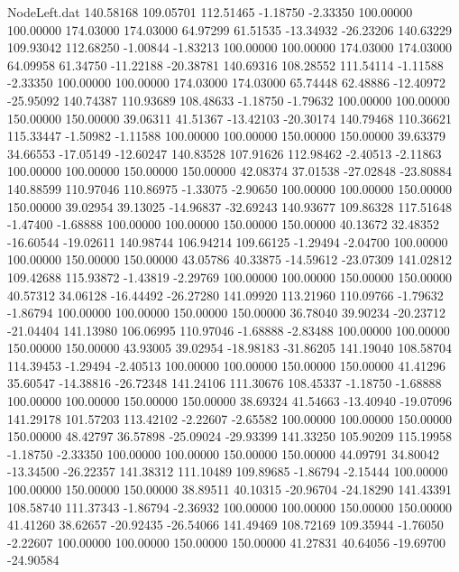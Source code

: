 \begin{filecontents}{NodeLeft.dat}
 140.58168  109.05701  112.51465    -1.18750   -2.33350  100.00000  100.00000  174.03000  174.03000   64.97299   61.51535  -13.34932  -26.23206
 140.63229  109.93042  112.68250    -1.00844   -1.83213  100.00000  100.00000  174.03000  174.03000   64.09958   61.34750  -11.22188  -20.38781
 140.69316  108.28552  111.54114    -1.11588   -2.33350  100.00000  100.00000  174.03000  174.03000   65.74448   62.48886  -12.40972  -25.95092
 140.74387  110.93689  108.48633    -1.18750   -1.79632  100.00000  100.00000  150.00000  150.00000   39.06311   41.51367  -13.42103  -20.30174
 140.79468  110.36621  115.33447    -1.50982   -1.11588  100.00000  100.00000  150.00000  150.00000   39.63379   34.66553  -17.05149  -12.60247
 140.83528  107.91626  112.98462    -2.40513   -2.11863  100.00000  100.00000  150.00000  150.00000   42.08374   37.01538  -27.02848  -23.80884
 140.88599  110.97046  110.86975    -1.33075   -2.90650  100.00000  100.00000  150.00000  150.00000   39.02954   39.13025  -14.96837  -32.69243
 140.93677  109.86328  117.51648    -1.47400   -1.68888  100.00000  100.00000  150.00000  150.00000   40.13672   32.48352  -16.60544  -19.02611
 140.98744  106.94214  109.66125    -1.29494   -2.04700  100.00000  100.00000  150.00000  150.00000   43.05786   40.33875  -14.59612  -23.07309
 141.02812  109.42688  115.93872    -1.43819   -2.29769  100.00000  100.00000  150.00000  150.00000   40.57312   34.06128  -16.44492  -26.27280
 141.09920  113.21960  110.09766    -1.79632   -1.86794  100.00000  100.00000  150.00000  150.00000   36.78040   39.90234  -20.23712  -21.04404
 141.13980  106.06995  110.97046    -1.68888   -2.83488  100.00000  100.00000  150.00000  150.00000   43.93005   39.02954  -18.98183  -31.86205
 141.19040  108.58704  114.39453    -1.29494   -2.40513  100.00000  100.00000  150.00000  150.00000   41.41296   35.60547  -14.38816  -26.72348
 141.24106  111.30676  108.45337    -1.18750   -1.68888  100.00000  100.00000  150.00000  150.00000   38.69324   41.54663  -13.40940  -19.07096
 141.29178  101.57203  113.42102    -2.22607   -2.65582  100.00000  100.00000  150.00000  150.00000   48.42797   36.57898  -25.09024  -29.93399
 141.33250  105.90209  115.19958    -1.18750   -2.33350  100.00000  100.00000  150.00000  150.00000   44.09791   34.80042  -13.34500  -26.22357
 141.38312  111.10489  109.89685    -1.86794   -2.15444  100.00000  100.00000  150.00000  150.00000   38.89511   40.10315  -20.96704  -24.18290
 141.43391  108.58740  111.37343    -1.86794   -2.36932  100.00000  100.00000  150.00000  150.00000   41.41260   38.62657  -20.92435  -26.54066
 141.49469  108.72169  109.35944    -1.76050   -2.22607  100.00000  100.00000  150.00000  150.00000   41.27831   40.64056  -19.69700  -24.90584

\end{filecontents}
